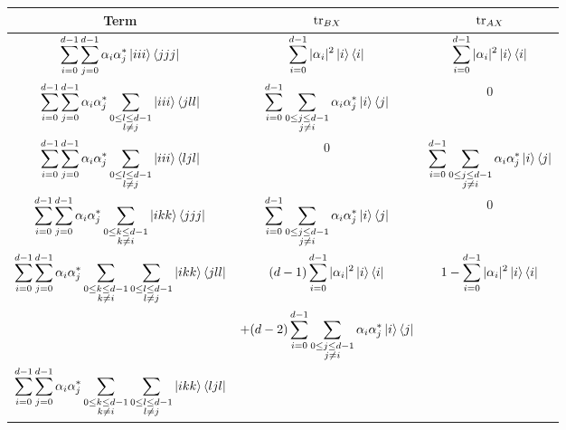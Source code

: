 \documentclass[reqno]{amsart}
\numberwithin{lemma}{section}
\numberwithin{proposition}{section}
\newcommand{\tr}{\textnormal{tr}}
\begin{document}
{\begin{tabular}{|c|c|c|}
\hline
\textbf{Term} & $\tr_{BX}$ & $\tr_{AX}$\\
\hline
$\displaystyle \sum_{i=0}^{d-1} \sum_{j=0}^{d-1} \alpha_{i} \alpha_{j}^{*} \ket{iii}\bra{jjj}$ & $\displaystyle \sum_{i=0}^{d-1} \vert \alpha_{i} \vert^{2} \ket{i} \bra{i}$ & $\displaystyle \sum_{i=0}^{d-1} \vert \alpha_{i} \vert^{2} \ket{i} \bra{i}$\\
\hline
$\displaystyle \sum_{i=0}^{d-1} \sum_{j=0}^{d-1} \alpha_{i} \alpha_{j}^{*} \sum_{\substack{0 \leq l \leq d-1\\ l \neq j}} \ket{iii}\bra{jll}$ &
$\displaystyle \sum_{i=0}^{d-1} \sum_{\substack{0 \leq j \leq d-1\\ j \neq i}} \alpha_{i} \alpha_{j}^{*} \ket{i} \bra{j}$ &
$0$\\
\hline
$\displaystyle \sum_{i=0}^{d-1} \sum_{j=0}^{d-1} \alpha_{i} \alpha_{j}^{*} \sum_{\substack{0 \leq l \leq d-1\\ l \neq j}} \ket{iii} \bra{ljl}$ &
$\displaystyle 0$ &
$\displaystyle \sum_{i=0}^{d-1} \sum_{\substack{0 \leq j \leq d-1\\ j \neq i}} \alpha_{i} \alpha_{j}^{*} \ket{i}\bra{j}$\\
\hline
$\displaystyle \sum_{i=0}^{d-1} \sum_{j=0}^{d-1} \alpha_{i} \alpha_{j}^{*} \sum_{\substack{0 \leq k \leq d-1\\ k \neq i}} \ket{ikk}\bra{jjj}$ &
$\displaystyle \sum_{i=0}^{d-1} \sum_{\substack{0 \leq j \leq d-1\\ j \neq i}} \alpha_{i} \alpha_{j}^{*} \ket{i}\bra{j}$ & $0$\\
\hline
$\displaystyle \sum_{i=0}^{d-1} \sum_{j=0}^{d-1} \alpha_{i} \alpha_{j}^{*} \sum_{\substack{0 \leq k \leq d-1\\ k \neq i}} \sum_{\substack{0 \leq l \leq d-1\\ l \neq j}} \ket{ikk}\bra{jll}$ &
$\displaystyle (d-1) \sum_{i=0}^{d-1} \vert \alpha_{i} \vert^{2} \ket{i}\bra{i}$ &
$\displaystyle 1 - \sum_{i=0}^{d-1} \vert \alpha_{i} \vert^{2} \ket{i} \bra{i}$\\
   &  $\displaystyle + (d-2) \sum_{i=0}^{d-1} \sum_{\substack{0 \leq j \leq d-1\\ j \neq i}} \alpha_{i} \alpha_{j}^{*} \ket{i}\bra{j}$  & \\
\hline
$\displaystyle \sum_{i=0}^{d-1} \sum_{j=0}^{d-1} \alpha_{i} \alpha_{j}^{*} \sum_{\substack{0 \leq k \leq d-1\\ k \neq i}} \sum_{\substack{0 \leq l \leq d-1\\ l \neq j}} \ket{ikk}\bra{ljl}$ &

\end{tabular}}
\end{document}
